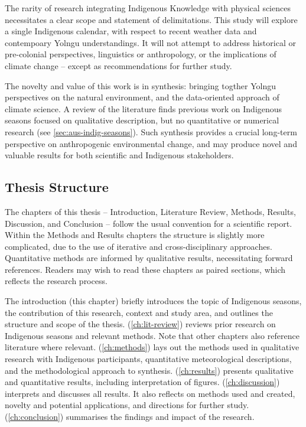 The rarity of research integrating Indigenous Knowledge with physical sciences
necessitates a clear scope and statement of delimitations.  This study will
explore a single Indigenous calendar, with respect to recent weather data
and contempoary Yolngu understandings.  It will not attempt to address historical
or pre-colonial perspectives, linguistics or anthropology, or the implications
of climate change -- except as recommendations for further study.

The novelty and value of this work is in synthesis: bringing
togther Yolngu perspectives on the natural environment, and the
data-oriented approach of climate science.  A review of the literature
finds previous work on Indigenous seasons focused on qualitative description, but
no quantitative or numerical research (see \cref{sec:aus-indig-seasons}).
Such synthesis provides a crucial long-term perspective on
anthropogenic environmental change, and may produce novel and valuable
results for both scientific and Indigenous stakeholders.



\subsection*{Thesis Structure}

The chapters of this thesis -- Introduction, Literature Review, Methods,
Results, Discussion, and Conclusion -- follow the usual convention for
a scientific report.  Within the Methods and Results chapters
the structure is slightly more complicated, due to the use of iterative and
cross-disciplinary approaches.  Quantitative methods are informed by
qualitative results, necessitating forward references.  Readers may wish
to read these chapters as paired sections, which reflects the research
process.

The introduction (this chapter) briefly introduces the topic of
Indigenous seasons, the contribution of this research, context and
study area, and outlines the structure and scope of the thesis.
 (\cref{ch:lit-review}) reviews prior research
on Indigenous seasons and relevant methods.  Note that other chapters
also reference literature where relevant.
 (\cref{ch:methods}) lays out the methods used in
qualitative research with Indigenous participants, quantitative meteorological
descriptions, and the methodological approach to synthesis.
 (\cref{ch:results}) presents qualitative and
quantitative results, including interpretation of figures.
 (\cref{ch:discussion}) interprets and discusses
all results.  It also reflects on methods used and created, novelty and
potential applications, and directions for further study.
 (\cref{ch:conclusion}) summarises the findings
and impact of the research.

